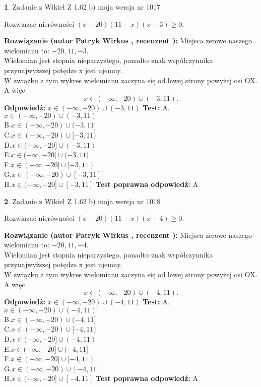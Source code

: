 \documentclass[12pt, a4paper]{article}
\theoremstyle{definition} %
\newtheorem{zad}{}
\newcommand{\zadStart}[1]{\begin{zad}#1\newline}
\newcommand{\zadStop}{\end{zad}}
\newcommand{\rozwStart}[2]{\noindent \textbf{Rozwiązanie (autor #1 , recenzent #2): }\newline}
\newcommand{\rozwStop}{\newline}
\newcommand{\odpStart}{\noindent \textbf{Odpowiedź:}\newline}
\newcommand{\odpStop}{\newline}
\newcommand{\testStart}{\noindent \textbf{Test:}\newline}
\newcommand{\testStop}{\newline}
\newcommand{\kluczStart}{\noindent \textbf{Test poprawna odpowiedź:}\newline}
\newcommand{\kluczStop}{\newline}
\begin{document}
\zadStart{Zadanie z Wikieł Z 1.62 b) moja wersja nr 1017}

Rozwiązać nierówności $(x+20)(11-x)(x+3)\ge0$.
\zadStop
\rozwStart{Patryk Wirkus}{}
Miejsca zerowe naszego wielomianu to: $-20, 11, -3$.\\
Wielomian jest stopnia nieparzystego, ponadto znak współczynnika przy\linebreak najwyższej potędze x jest ujemny.\\ W związku z tym wykres wielomianu zaczyna się od lewej strony powyżej osi OX. A więc $$x \in (-\infty,-20) \cup (-3,11).$$
\rozwStop
\odpStart
$x \in (-\infty,-20) \cup (-3,11)$
\odpStop
\testStart
A.$x \in (-\infty,-20) \cup (-3,11)$\\
B.$x \in (-\infty,-20) \cup (-3,11]$\\
C.$x \in (-\infty,-20) \cup [-3,11)$\\
D.$x \in (-\infty,-20] \cup (-3,11)$\\
E.$x \in (-\infty,-20] \cup (-3,11]$\\
F.$x \in (-\infty,-20] \cup [-3,11)$\\
G.$x \in (-\infty,-20) \cup [-3,11]$\\
H.$x \in (-\infty,-20] \cup [-3,11]$
\testStop
\kluczStart
A
\kluczStop



\zadStart{Zadanie z Wikieł Z 1.62 b) moja wersja nr 1018}

Rozwiązać nierówności $(x+20)(11-x)(x+4)\ge0$.
\zadStop
\rozwStart{Patryk Wirkus}{}
Miejsca zerowe naszego wielomianu to: $-20, 11, -4$.\\
Wielomian jest stopnia nieparzystego, ponadto znak współczynnika przy\linebreak najwyższej potędze x jest ujemny.\\ W związku z tym wykres wielomianu zaczyna się od lewej strony powyżej osi OX. A więc $$x \in (-\infty,-20) \cup (-4,11).$$
\rozwStop
\odpStart
$x \in (-\infty,-20) \cup (-4,11)$
\odpStop
\testStart
A.$x \in (-\infty,-20) \cup (-4,11)$\\
B.$x \in (-\infty,-20) \cup (-4,11]$\\
C.$x \in (-\infty,-20) \cup [-4,11)$\\
D.$x \in (-\infty,-20] \cup (-4,11)$\\
E.$x \in (-\infty,-20] \cup (-4,11]$\\
F.$x \in (-\infty,-20] \cup [-4,11)$\\
G.$x \in (-\infty,-20) \cup [-4,11]$\\
H.$x \in (-\infty,-20] \cup [-4,11]$
\testStop
\kluczStart
A
\kluczStop
\end{document}
